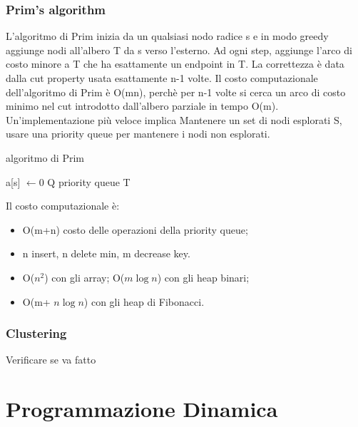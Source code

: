 \documentclass{article}
\begin{document}
\subsubsection{Prim's algorithm}
L'algoritmo di Prim inizia da un qualsiasi nodo radice s e in modo greedy aggiunge nodi all'albero T da s verso l'esterno. Ad ogni step, aggiunge l'arco di costo minore a T che ha esattamente un endpoint in T. La correttezza è data dalla cut property usata esattamente n-1 volte.
Il costo computazionale dell'algoritmo di Prim è O(mn), perchè per n-1 volte si cerca un arco di costo minimo nel cut introdotto dall'albero parziale in tempo O(m).
Un'implementazione più veloce implica Mantenere un set di nodi esplorati S, usare una priority queue per mantenere i nodi non esplorati. 
\begin{center}
\begin{algorithm}
\caption{algoritmo di Prim}
a[s] $\leftarrow 0$\;
Q priority queue\;
\Return T\;
\end{algorithm}
\end{center}
Il costo computazionale è:
\begin{itemize}
    \item O(m+n) costo delle operazioni della priority queue;
    \item n insert, n delete min, m decrease key.
    \item O($n^2$) con gli array; O($m \log n$) con gli heap binari;
    \item O(m+ $n \log n$) con gli heap di Fibonacci.
\end{itemize}
\subsubsection{Clustering}
Verificare se va fatto
\section{Programmazione Dinamica}
\end{document}
